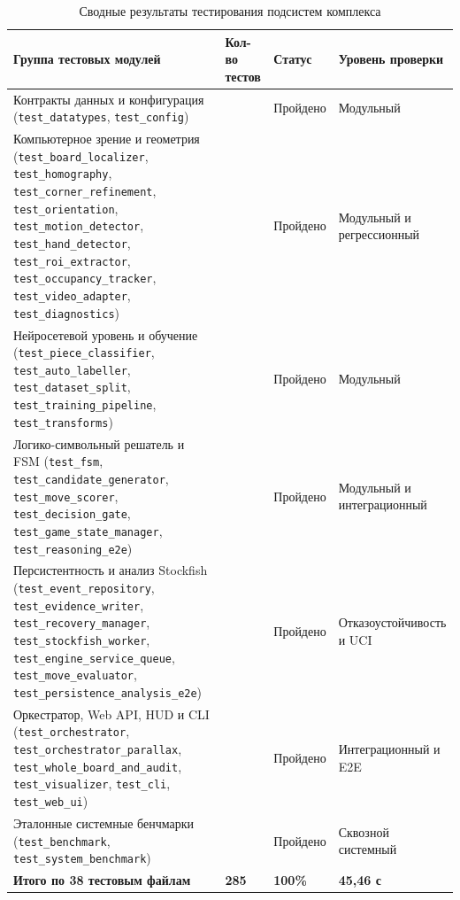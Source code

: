 \begin{table}[htbp]
\centering
\caption{Сводные результаты тестирования подсистем комплекса}
\label{tab:test-results}
\begin{tabular}{|>{\raggedright\arraybackslash}p{}|>{\centering\arraybackslash}p{}|>{\centering\arraybackslash}p{}|>{\raggedright\arraybackslash}p{}|}
\hline
\textbf{Группа тестовых модулей} & \textbf{Кол-во тестов} & \textbf{Статус} & \textbf{Уровень проверки} \\
\hline
Контракты данных и конфигурация (\texttt{test\_datatypes}, \texttt{test\_config}) & 39 & Пройдено & Модульный \\
\hline
Компьютерное зрение и геометрия (\texttt{test\_board\_localizer}, \texttt{test\_homography}, \texttt{test\_corner\_refinement}, \texttt{test\_orientation}, \texttt{test\_motion\_detector}, \texttt{test\_hand\_detector}, \texttt{test\_roi\_extractor}, \texttt{test\_occupancy\_tracker}, \texttt{test\_video\_adapter}, \texttt{test\_diagnostics}) & 75 & Пройдено & Модульный и регрессионный \\
\hline
Нейросетевой уровень и обучение (\texttt{test\_piece\_classifier}, \texttt{test\_auto\_labeller}, \texttt{test\_dataset\_split}, \texttt{test\_training\_pipeline}, \texttt{test\_transforms}) & 28 & Пройдено & Модульный \\
\hline
Логико-символьный решатель и FSM (\texttt{test\_fsm}, \texttt{test\_candidate\_generator}, \texttt{test\_move\_scorer}, \texttt{test\_decision\_gate}, \texttt{test\_game\_state\_manager}, \texttt{test\_reasoning\_e2e}) & 39 & Пройдено & Модульный и интеграционный \\
\hline
Персистентность и анализ Stockfish (\texttt{test\_event\_repository}, \texttt{test\_evidence\_writer}, \texttt{test\_recovery\_manager}, \texttt{test\_stockfish\_worker}, \texttt{test\_engine\_service\_queue}, \texttt{test\_move\_evaluator}, \texttt{test\_persistence\_analysis\_e2e}) & 22 & Пройдено & Отказоустойчивость и UCI \\
\hline
Оркестратор, Web API, HUD и CLI (\texttt{test\_orchestrator}, \texttt{test\_orchestrator\_parallax}, \texttt{test\_whole\_board\_and\_audit}, \texttt{test\_visualizer}, \texttt{test\_cli}, \texttt{test\_web\_ui}) & 74 & Пройдено & Интеграционный и E2E \\
\hline
Эталонные системные бенчмарки (\texttt{test\_benchmark}, \texttt{test\_system\_benchmark}) & 8 & Пройдено & Сквозной системный \\
\hline
\textbf{Итого по 38 тестовым файлам} & \textbf{285} & \textbf{100\%} & \textbf{45,46 с} \\
\hline
\end{tabular}
\end{table}

